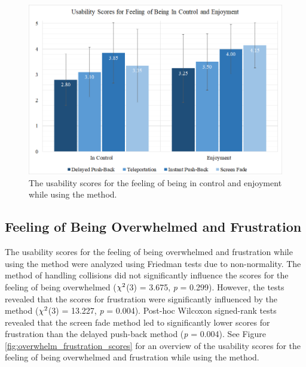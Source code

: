 \begin{figure}[ph]
\centering
\includegraphics[width=1\textwidth]{img/incontrol_enjoyment_scores.png}
\caption{The usability scores for the feeling of being in control and enjoyment while using the method.}
\label{fig:incontrol_enjoyment_scores}
\end{figure}

\subsection{Feeling of Being Overwhelmed and Frustration}

The usability scores for the feeling of being overwhelmed and frustration while using the method were analyzed using Friedman tests due to non-normality. The method of handling collisions did not significantly influence the scores for the feeling of being overwhelmed (\textit{$\chi\textsuperscript{2}$}(3) = 3.675, \textit{p} = 0.299). However, the tests revealed that the scores for frustration were significantly influenced by the method (\textit{$\chi\textsuperscript{2}$}(3) = 13.227, \textit{p} = 0.004). Post-hoc Wilcoxon signed-rank tests revealed that the screen fade method led to significantly lower scores for frustration than the delayed push-back method (\textit{p} = 0.004). See Figure \ref{fig:overwhelm_frustration_scores} for an overview of the usability scores for the feeling of being overwhelmed and frustration while using the method.

